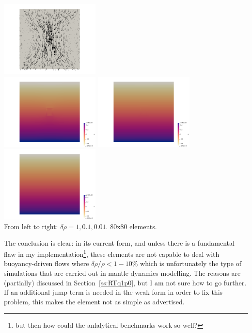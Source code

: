\begin{center}
\includegraphics[width=5cm]{python_codes/fieldstone_77/results/block/drho/vels2}\\
\includegraphics[width=5cm]{python_codes/fieldstone_77/results/block/drho/press1}
\includegraphics[width=5cm]{python_codes/fieldstone_77/results/block/drho/press3}
\includegraphics[width=5cm]{python_codes/fieldstone_77/results/block/drho/press2}\\
{\captionfont From left to right: $\delta \rho=1,0.1,0.01$. 80x80 elements.}
\end{center}

The conclusion is clear: in its current form, and unless there is a fundamental 
flaw in my implementation\footnote{but then how could the anlalytical benchmarks work 
so well?}, these elements are not capable to 
deal with buoyancy-driven flows where $\delta \rho/\rho < 1-10\%$ which is 
unfortunately the type of simulations that are carried out in mantle dynamics modelling.
The reasons are (partially) discussed in Section~\ref{ss:RTq1p0}, but 
I am not sure how to go further. If an additional jump term is needed in the 
weak form in order to fix this problem, this makes the element not as simple as
advertised. 





